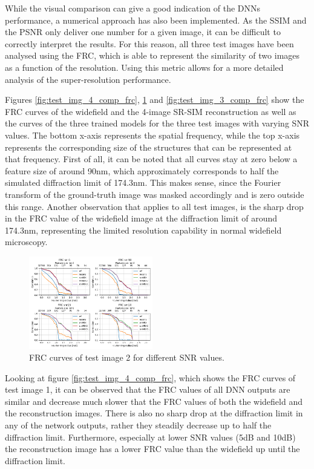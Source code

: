 \documentclass[conference]{IEEEtran}
\begin{document}
While the visual comparison can give a good indication of the DNNs performance, a numerical approach has also been implemented. As the SSIM and the PSNR only deliver one number for a given image, it can be difficult to correctly interpret the results. For this reason, all three test images have been analysed using the FRC, which is able to represent the similarity of two images as a function of the resolution. Using this metric allows for a more detailed analysis of the super-resolution performance.

Figures \ref{fig:test_img_4_comp_frc}, \ref{fig:test_img_2_comp_frc} and \ref{fig:test_img_3_comp_frc} show the FRC curves of the widefield and the 4-image SR-SIM reconstruction as well as the curves of the three trained models for the three test images with varying SNR values. The bottom x-axis represents the spatial frequency, while the top x-axis represents the corresponding size of the structures that can be represented at that frequency. First of all, it can be noted that all curves stay at zero below a feature size of around 90nm, which approximately corresponds to half the simulated diffraction limit of 174.3nm. This makes sense, since the Fourier transform of the ground-truth image was masked accordingly and is zero outside this range. Another observation that applies to all test images, is the sharp drop in the FRC value of the widefield image at the diffraction limit of around 174.3nm, representing the limited resolution capability in normal widefield microscopy.

\begin{figure}[h]
    \centering
    \includegraphics[width=0.48\textwidth]{images/test_img_2_comp_frc.png}
    \caption{FRC curves of test image 2 for different SNR values.}
    \label{fig:test_img_2_comp_frc}
\end{figure}

Looking at figure \ref{fig:test_img_4_comp_frc}, which shows the FRC curves of test image 1, it can be observed that the FRC values of all DNN outputs are similar and decrease much slower that the FRC values of both the widefield and the reconstruction images. There is also no sharp drop at the diffraction limit in any of the network outputs, rather they steadily decrease up to half the diffraction limit. Furthermore, especially at lower SNR values (5dB and 10dB) the reconstruction image has a lower FRC value than the widefield up until the diffraction limit.
\end{document}

